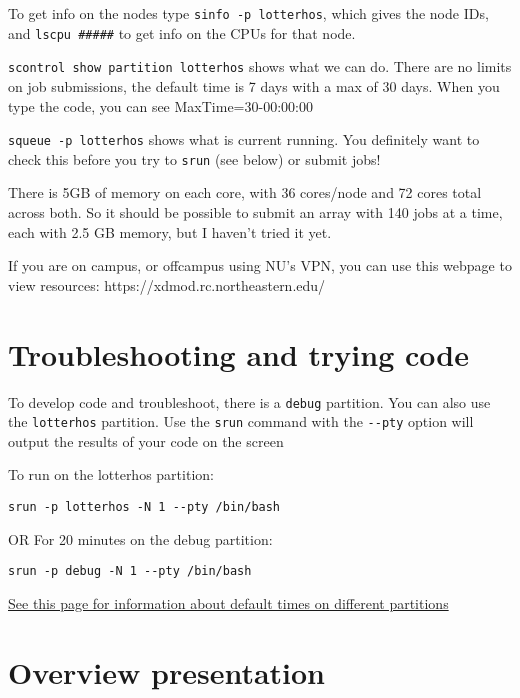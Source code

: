 \documentclass[
  letterpaper,
  DIV=11,
  numbers=noendperiod]{scrreprt}
\begin{document}
To get info on the nodes type \texttt{sinfo\ -p\ lotterhos}, which gives
the node IDs, and \texttt{lscpu\ \#\#\#\#\#} to get info on the CPUs for
that node.

\texttt{scontrol\ show\ partition\ lotterhos} shows what we can do.
There are no limits on job submissions, the default time is 7 days with
a max of 30 days. When you type the code, you can see
MaxTime=30-00:00:00

\texttt{squeue\ -p\ lotterhos} shows what is current running. You
definitely want to check this before you try to \texttt{srun} (see
below) or submit jobs!

There is 5GB of memory on each core, with 36 cores/node and 72 cores
total across both. So it should be possible to submit an array with 140
jobs at a time, each with 2.5 GB memory, but I haven't tried it yet.

If you are on campus, or offcampus using NU's VPN, you can use this
webpage to view resources: https://xdmod.rc.northeastern.edu/

\hypertarget{troubleshooting-and-trying-code}{%
\section*{\texorpdfstring{\textbf{Troubleshooting and trying
code}}{Troubleshooting and trying code}}\label{troubleshooting-and-trying-code}}

To develop code and troubleshoot, there is a \texttt{debug} partition.
You can also use the \texttt{lotterhos} partition. Use the \texttt{srun}
command with the \texttt{-\/-pty} option will output the results of your
code on the screen

To run on the lotterhos partition:

\texttt{srun\ -p\ lotterhos\ -N\ 1\ -\/-pty\ /bin/bash}

OR For 20 minutes on the debug partition:

\texttt{srun\ -p\ debug\ -N\ 1\ -\/-pty\ /bin/bash}

\href{https://rc-docs.northeastern.edu/en/latest/hardware/partitions.html\#introduction}{See
this page for information about default times on different partitions}

\hypertarget{overview-presentation}{%
\section*{\texorpdfstring{\textbf{Overview
presentation}}{Overview presentation}}\label{overview-presentation}}
\end{document}
